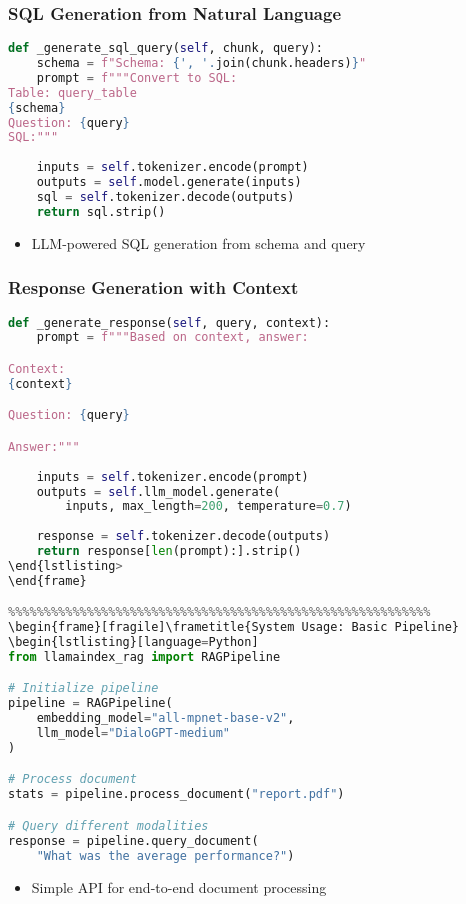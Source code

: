 \begin{frame}[fragile]\frametitle{SQL Generation from Natural Language}
\begin{lstlisting}[language=Python]
def _generate_sql_query(self, chunk, query):
    schema = f"Schema: {', '.join(chunk.headers)}"
    prompt = f"""Convert to SQL:
Table: query_table
{schema}
Question: {query}
SQL:"""
    
    inputs = self.tokenizer.encode(prompt)
    outputs = self.model.generate(inputs)
    sql = self.tokenizer.decode(outputs)
    return sql.strip()
\end{lstlisting}
\begin{itemize}
\item LLM-powered SQL generation from schema and query
\end{itemize}
\end{frame}

\begin{frame}[fragile]\frametitle{Response Generation with Context}
\begin{lstlisting}[language=Python]
def _generate_response(self, query, context):
    prompt = f"""Based on context, answer:

Context:
{context}

Question: {query}

Answer:"""
    
    inputs = self.tokenizer.encode(prompt)
    outputs = self.llm_model.generate(
        inputs, max_length=200, temperature=0.7)
    
    response = self.tokenizer.decode(outputs)
    return response[len(prompt):].strip()
\end{lstlisting>
\end{frame}

%%%%%%%%%%%%%%%%%%%%%%%%%%%%%%%%%%%%%%%%%%%%%%%%%%%%%%%%%%%
\begin{frame}[fragile]\frametitle{System Usage: Basic Pipeline}
\begin{lstlisting}[language=Python]
from llamaindex_rag import RAGPipeline

# Initialize pipeline
pipeline = RAGPipeline(
    embedding_model="all-mpnet-base-v2",
    llm_model="DialoGPT-medium"
)

# Process document
stats = pipeline.process_document("report.pdf")

# Query different modalities
response = pipeline.query_document(
    "What was the average performance?")
\end{lstlisting}
\begin{itemize}
\item Simple API for end-to-end document processing
\end{itemize}
\end{frame}

